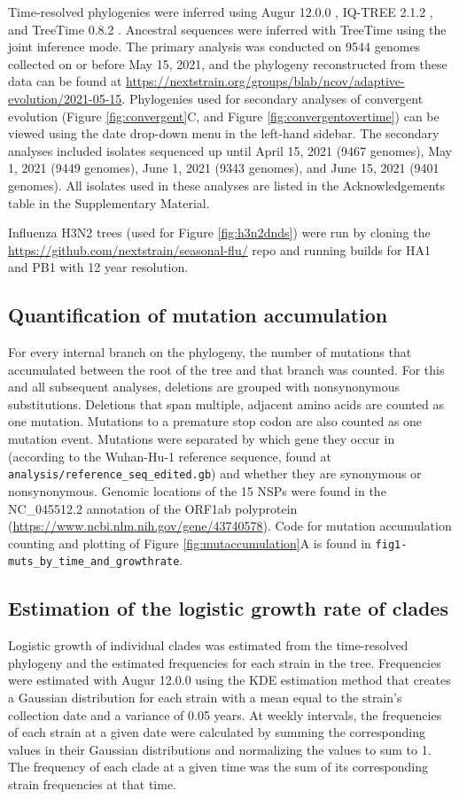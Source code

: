 \documentclass[11pt,oneside,letterpaper]{article}
\begin{document}
Time-resolved phylogenies were inferred using Augur 12.0.0 \cite{Huddleston2021-uh}, IQ-TREE 2.1.2 \cite{Nguyen2015-bp}, and TreeTime 0.8.2 \cite{Sagulenko2018-ok}. 
Ancestral sequences were inferred with TreeTime using the joint inference mode. The primary analysis was conducted on 9544 genomes collected on or before May 15, 2021, and the phylogeny reconstructed from these data can be found at \url{https://nextstrain.org/groups/blab/ncov/adaptive-evolution/2021-05-15}. 
Phylogenies used for secondary analyses of convergent evolution (Figure \ref{fig:convergent}C, and Figure \ref{fig:convergentovertime}) can be viewed using the date drop-down menu in the left-hand sidebar. 
The secondary analyses included isolates sequenced up until April 15, 2021 (9467 genomes), May 1, 2021 (9449 genomes), June 1, 2021 (9343 genomes), and June 15, 2021 (9401 genomes). 
All isolates used in these analyses are listed in the Acknowledgements table in the Supplementary Material.

Influenza H3N2 trees (used for Figure \ref{fig:h3n2dnds}) were run by cloning the \url{https://github.com/nextstrain/seasonal-flu/} repo and running builds for HA1 and PB1 with 12 year resolution.

\subsection*{Quantification of mutation accumulation}
For every internal branch on the phylogeny, the number of mutations that accumulated between the root of the tree and that branch was counted. 
For this and all subsequent analyses, deletions are grouped with nonsynonymous substitutions. Deletions that span multiple, adjacent amino acids are counted as one mutation. 
Mutations to a premature stop codon are also counted as one mutation event. 
Mutations were separated by which gene they occur in (according to the Wuhan-Hu-1 reference sequence, found at \texttt{analysis/reference\_seq\_edited.gb}) and whether they are synonymous or nonsynonymous. 
Genomic locations of the 15 NSPs were found in the NC\_045512.2 annotation of the ORF1ab polyprotein (\url{https://www.ncbi.nlm.nih.gov/gene/43740578}). Code for mutation accumulation counting and plotting of Figure \ref{fig:mutaccumulation}A is found in \texttt{fig1-muts\_by\_time\_and\_growthrate}.

\subsection*{Estimation of the logistic growth rate of clades}
Logistic growth of individual clades was estimated from the time-resolved phylogeny and the estimated frequencies for each strain in the tree. 
Frequencies were estimated with Augur 12.0.0 \cite{Huddleston2021-uh} using the KDE estimation method that creates a Gaussian distribution for each strain with a mean equal to the strain’s collection date and a variance of 0.05 years. 
At weekly intervals, the frequencies of each strain at a given date were calculated by summing the corresponding values in their Gaussian distributions and normalizing the values to sum to 1. 
The frequency of each clade at a given time was the sum of its corresponding strain frequencies at that time.
\end{document}
